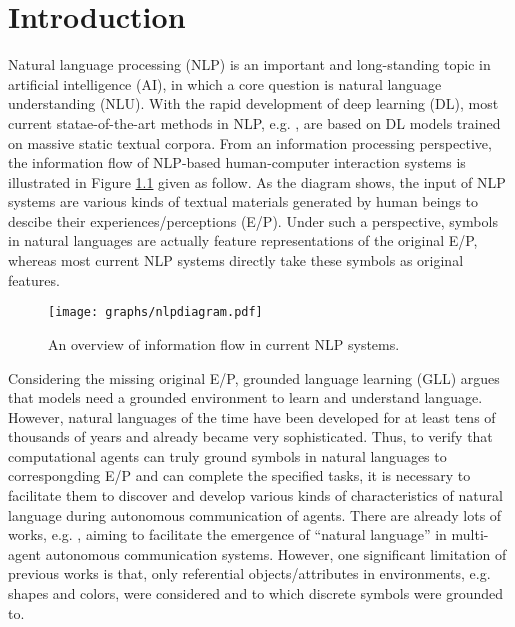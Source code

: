 \chapter{Introduction}
\label{ch1:intro}

Natural language processing (NLP) is an important and long-standing topic in artificial intelligence (AI), in which a core question is natural language understanding (NLU). With the rapid development of deep learning (DL), most current statae-of-the-art methods in NLP, e.g. \cite{socher2013recursive, word2vec2013, kim2014cnn}, are based on DL models trained on massive static textual corpora. From an information processing perspective, the information flow of NLP-based human-computer interaction systems is illustrated in Figure \ref{fig1:nlpdiagram} given as follow. As the diagram shows, the input of NLP systems are various kinds of textual materials generated by human beings to descibe their experiences/perceptions (E/P). Under such a perspective, symbols in natural languages are actually feature representations of the original E/P, whereas most current NLP systems directly take these symbols as original features.

\begin{figure}[!h]
  \centering
  \texttt{[image: graphs/nlpdiagram.pdf]}
  \caption{An overview of information flow in current NLP systems.}
  \label{fig1:nlpdiagram}
\end{figure}

Considering the missing original E/P, grounded language learning (GLL) argues that models need a grounded environment to learn and understand language\cite{matuszek2018grounded}. However, natural languages of the time have been developed for at least tens of thousands of years\cite{berwick2016only} and already became very sophisticated. Thus, to verify that computational agents can truly ground symbols in natural languages to correspongding E/P and can complete the specified tasks, it is necessary to facilitate them to discover and develop various kinds of characteristics of natural language during autonomous communication of agents. There are already lots of works, e.g. \cite{hill2017understanding, havrylov2017emergence, yu2018interactive, kottur2017natural}, aiming to facilitate the emergence of ``natural language'' in multi-agent autonomous communication systems. However, one significant limitation of previous works is that, only referential objects/attributes in environments, e.g. shapes and colors, were considered and to which discrete symbols were grounded to.

